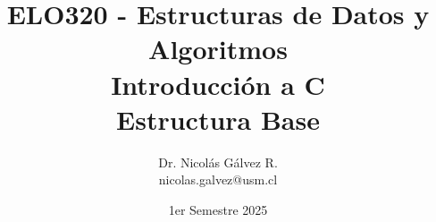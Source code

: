 \documentclass{beamer}
\title{ELO320 - Estructuras de Datos y Algoritmos\\Introducción a C\\Estructura Base}
\author{Dr. Nicolás Gálvez R.\\{\small nicolas.galvez@usm.cl}}
\institute{Ing. Civil Telemática - Departamento de Electrónica}
\date{1er Semestre 2025}
\begin{document}
\frame{\titlepage}

%
%

%
%
%
\end{document}
